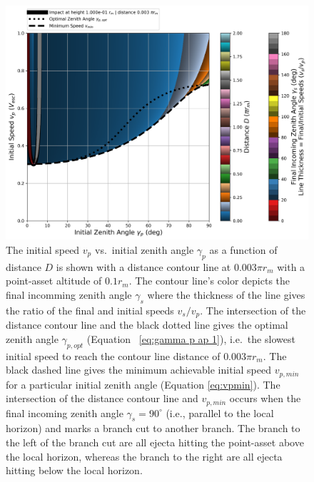 \documentclass{article}
\begin{document}
\begin{figure}[!htb]
	\centering
	\includegraphics[width=1.0\linewidth]{dist_speed_zenith_plot_020_1.000e-01_0.010.png}
	\caption{The initial speed $v_p$ vs.\ initial zenith angle $\gamma_p$ as a function of distance $D$ is shown with a distance contour line at $0.003\pi r_m$ with a point-asset altitude of $0.1 r_m$. The contour line's color depicts the final incomming zenith angle $\gamma_s$ where the thickness of the line gives the ratio of the final and initial speeds $v_s/v_p$. The intersection of the distance contour line and the black dotted line gives the optimal zenith angle $\gamma_{p,opt}$ (Equation~
		\eqref{eq:gamma p ap 1}), i.e.\ the slowest initial speed to reach the contour line distance of $0.003\pi r_m$. The black dashed line gives the minimum achievable initial speed $v_{p,min}$ for a particular initial zenith angle (Equation \eqref{eq:vpmin}). The intersection of the distance contour line and $v_{p,min}$ occurs when the final incoming zenith angle $\gamma_s = 90^\circ$ (i.e., parallel to the local horizon) and marks a branch cut to another branch. The branch to the left of the branch cut are all ejecta hitting the point-asset above the local horizon, whereas the branch to the right are all ejecta hitting below the local horizon.}\label{fig:dist_speed_zenith_plot_020_1.000e-01_0.010}
\end{figure}
\end{document}
